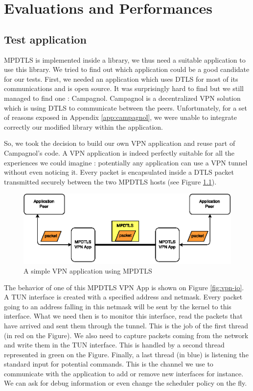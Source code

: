 \chapter{Evaluations and Performances}\label{chap:perfs}

\section{Test application}\label{sec:vpnapp}

MPDTLS is implemented inside a library, we thus need a suitable application to use this library. We tried to find out which application could be a good candidate for our tests. First, we needed an application which uses DTLS for most of its communications and is open source. It was surprisingly hard to find but we still managed to find one : Campagnol\cite{campagnol}. Campagnol is a decentralized VPN solution which is using DTLS to communicate between the peers. Unfortunately, for a set of reasons exposed in Appendix \ref{app:campagnol}, we were unable to integrate correctly our modified library within the application. 

So, we took the decision to build our own VPN application \cite{wolfssl-vpn} and reuse part of Campagnol's code. A VPN application is indeed perfectly suitable for all the experiences we could imagine : potentially any application can use a VPN tunnel without even noticing it. Every packet is encapsulated inside a DTLS packet transmitted securely between the two MPDTLS hosts (see Figure \ref{fig:vpn}).

\begin{figure}[!ht]
\centering
\includegraphics{images/vpn.eps}
\caption{A simple VPN application using MPDTLS}
\label{fig:vpn}
\end{figure}

The behavior of one of this MPDTLS VPN App is shown on Figure \ref{fig:vpn-io}. A TUN interface is created with a specified address and netmask. Every packet going to an address falling in this netmask will be sent by the kernel to this interface. What we need then is to monitor this interface, read the packets that have arrived and sent them through the tunnel. This is the job of the first thread (in red on the Figure). We also need to capture packets coming from the network and write them in the TUN interface. This is handled by a second thread represented in green on the Figure. Finally, a last thread (in blue) is listening the standard input for potential commands. This is the channel we use to communicate with the application to add or remove new interfaces for instance. We can ask for debug information or even change the scheduler policy on the fly.

